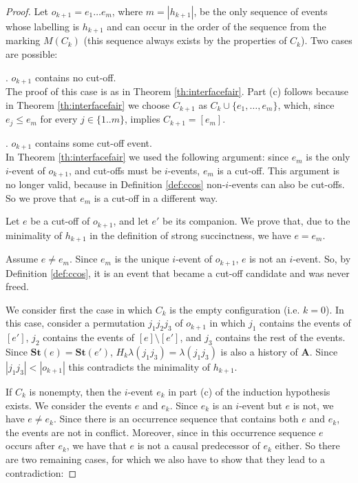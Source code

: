 \documentclass{llncs}
\def\prod{\mathbf{A}}
\newcommand{\st}[1]{\mathbf{St}(#1)}
\newcommand{\ma}[1]{M(#1)}
\begin{document}
\begin{proof}
Let $o_{k+1}=e_1 \dots e_m$, where $m = |h_{k+1}|$,  be the only sequence of events 
whose labelling is $h_{k+1}$ and can occur in the order of the sequence from the marking $\ma{C_{k}}$ 
(this sequence always exists by the properties of $C_{k}$). 
Two cases are possible:

\vspace{0.1cm}
. $o_{k+1}$ contains no cut-off.\\
The proof of this case is as in Theorem \ref{th:interfacefair}. Part (c) follows because in Theorem \ref{th:interfacefair}
we choose $C_{k+1}$ as $C_{k} \cup \{e_1, \ldots, e_m\}$, which, since $e_j \leq e_m$ for every $j \in \{1..m\}$, implies $C_{k+1} = [e_m]$.

\vspace{0.1cm}
. $o_{k+1}$ contains some cut-off event.\\
In Theorem \ref{th:interfacefair} we used the following argument: since $e_m$ is the only $i$-event of
$o_{k+1}$, and cut-offs must be $i$-events, $e_m$ is a cut-off. This argument is no longer valid,
because in Definition \ref{def:ccos} non-$i$-events can also be cut-offs. So we prove 
that $e_m$ is a cut-off in a different way.

Let $e$ be a cut-off of $o_{k+1}$, and let $e'$ be its companion. 
We prove that, due to the minimality of $h_{k+1}$ in the definition of strong succinctness,
we have $e=e_m$.

Assume $e \neq e_m$. Since $e_m$ is the unique $i$-event of $o_{k+1}$,
$e$ is not an $i$-event. So, by Definition \ref{def:ccos}, it is an event that became a cut-off candidate
and was never freed. 


We consider first the case in which $C_k$ is the empty configuration (i.e. $k=0$).
In this case, consider a permutation $j_1j_2j_3$ of $o_{k+1}$ in which $j_1$ contains the events of $[e']$, $j_2$ contains the events of $[e]\setminus [e']$, and $j_3$ contains the rest of the events.
Since $\st{e}=\st{e'}$, $H_k\lambda(j_1j_3)=\lambda(j_1j_3)$ is also a history of $\prod$.
Since $|j_1j_3|<|o_{k+1}|$ this contradicts the minimality of $h_{k+1}$.

If $C_{k}$ is nonempty, then the $i$-event $e_{k}$ in part (c) of the induction hypothesis exists.
We consider the events $e$ and $e_{k}$. Since $e_{k}$ is an $i$-event but $e$ is not,
we have $e \neq e_{k}$. Since there is an occurrence sequence that contains
both $e$ and $e_{k}$, the events are not in conflict. Moreover, since in this occurrence sequence
$e$ occurs after $e_{k}$, we have that $e$ is not a causal predecessor of $e_{k}$ either.
So there are two remaining cases, for which we also have to show that they lead to a contradiction: 


\end{proof}
\end{document}
